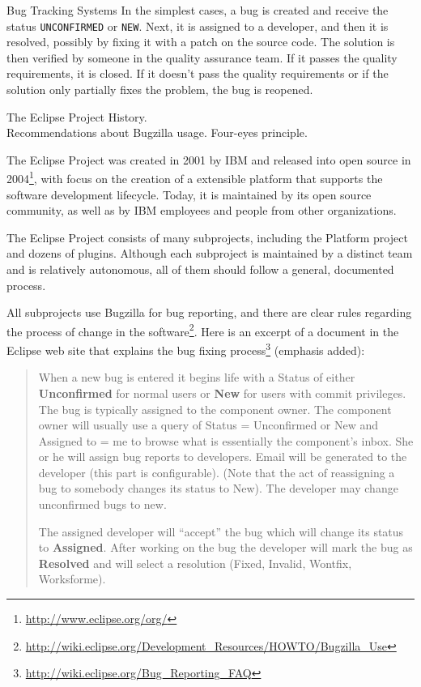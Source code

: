 \begin{subsection}{Bug Tracking Systems}
In the simplest cases, a bug is created and receive the status \texttt{UNCONFIRMED} or \texttt{NEW}. Next, it is assigned to a developer, and then it is resolved, possibly by fixing it with a patch on the source code. The solution is then verified by someone in the quality assurance team. If it passes the quality requirements, it is closed. If it doesn’t pass the quality requirements or if the solution only partially fixes the problem, the bug is reopened.
\end{subsection}

  \begin{subsection}{The Eclipse Project}
History. \\
Recommendations about Bugzilla usage. Four-eyes principle.

The Eclipse Project was created in 2001 by IBM and released into open source in 2004\footnote{\url{http://www.eclipse.org/org/}}, with focus on the creation of a extensible platform that supports the software development lifecycle. Today, it is maintained by its open source community, as well as by IBM employees and people from other organizations.

The Eclipse Project consists of many subprojects, including the Platform project and dozens of plugins. Although each subproject is maintained by a distinct team and is relatively autonomous, all of them should follow a general, documented process. 

All subprojects use Bugzilla for bug reporting, and there are clear rules regarding the process of change in the software\footnote{\url{http://wiki.eclipse.org/Development_Resources/HOWTO/Bugzilla_Use}}. Here is an excerpt of a document in the Eclipse web site that explains the bug fixing process\footnote{\url{http://wiki.eclipse.org/Bug_Reporting_FAQ}} (emphasis added):

\begin{quote}
When a new bug is entered it begins life with a Status of either \textbf{Unconfirmed} for normal users or \textbf{New} for users with commit privileges. The bug is typically assigned to the component owner. The component owner will usually use a query of Status = Unconfirmed or New and Assigned to = me to browse what is essentially the component's inbox. She or he will assign bug reports to developers. Email will be generated to the developer (this part is configurable). (Note that the act of reassigning a bug to somebody changes its status to New). The developer may change unconfirmed bugs to new.

The assigned developer will “accept” the bug which will change its status to \textbf{Assigned}. After working on the bug the developer will mark the bug as \textbf{Resolved} and will select a resolution (Fixed, Invalid, Wontfix, Worksforme).


\end{quote}
\end{subsection}
